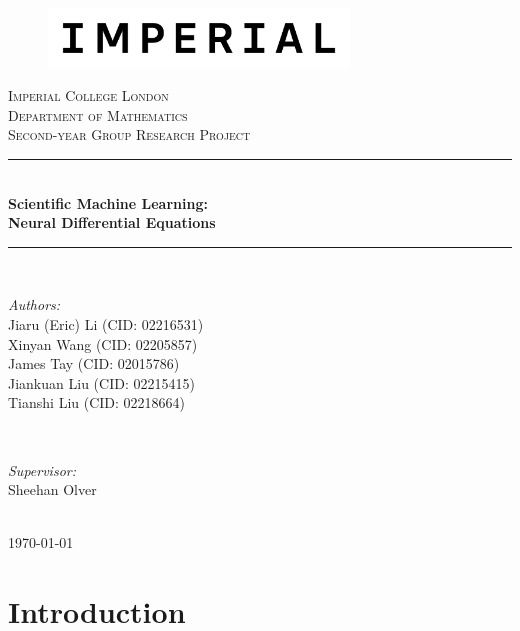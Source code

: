 \documentclass[a4paper,11pt,titlepage]{article}
\theoremstyle{definition}
\theoremstyle{plain}
\theoremstyle{remark}
\newcommand{\reporttitle}{Scientific Machine Learning:\\Neural Differential Equations}
\newcommand{\reportauthorA}{Jiaru (Eric) Li (CID: 02216531)}
\newcommand{\reportauthorB}{Xinyan Wang (CID: 02205857)}
\newcommand{\reportauthorC}{James Tay (CID: 02015786)}
\newcommand{\reportauthorD}{Jiankuan Liu (CID: 02215415)}
\newcommand{\reportauthorE}{Tianshi Liu (CID: 02218664)}
\newcommand{\supervisor}{Sheehan Olver}
\begin{document}
\begin{titlepage}
\newcommand{\HRule}{\rule{\linewidth}{0.5mm}}
\begin{figure}[h]
  \includegraphics[width=8cm]{figures/Imperial_logo.png}
  \vspace{1cm}
\end{figure}
\center
\textsc{\LARGE Imperial College London}\\[0.5cm] 
\textsc{\Large Department of Mathematics}\\[1.5cm] 
\textsc{\Large Second-year Group Research Project}\\[0.5cm]
\makeatletter
\HRule \\[0.6cm]
{\huge \bfseries \reporttitle}\\[0.6cm]
\HRule \\[1.5cm]
\begin{minipage}{0.4\textwidth}
\begin{flushleft} \large
\emph{Authors:}\\
\reportauthorA \\
\reportauthorB \\
\reportauthorC \\
\reportauthorD \\
\reportauthorE
\end{flushleft}
\end{minipage}
~
\begin{minipage}{0.4\textwidth}
\begin{flushright} \large
\emph{Supervisor:} \\
\supervisor
\end{flushright}
\end{minipage}\\[2cm]
\makeatother
\vfill
\makeatletter
{\large \today}\\[2cm]
\makeatother
\end{titlepage}

\begin{abstract}

\end{abstract}

\tableofcontents

\pagebreak
\section{Introduction}
\end{document}
